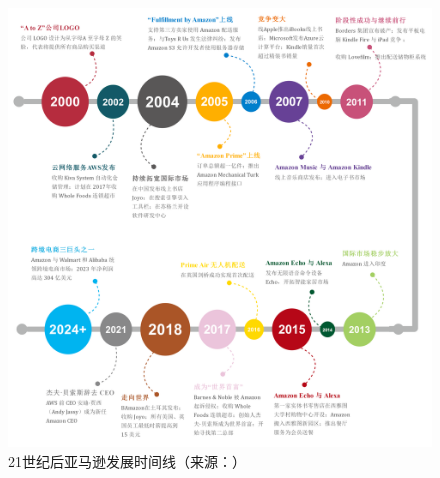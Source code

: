 \documentclass[12pt]{ctexart}
\begin{document}
\begin{figure}[htbp!]
    \centering
    \includegraphics[width=1\textwidth]{Images/4.png}
    \caption{21世纪后亚马逊发展时间线（来源：\cite{14,15}）}
\end{figure}
\end{document}
